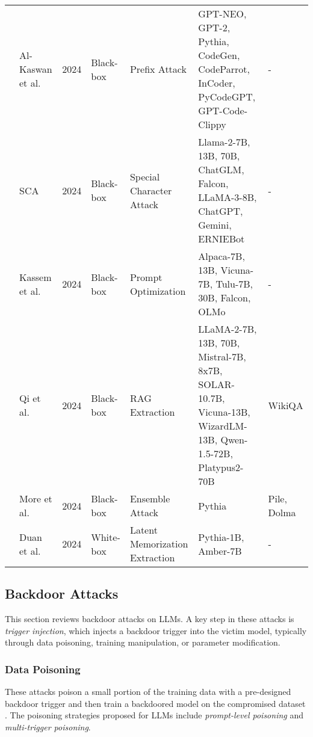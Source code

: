 \begin{table*}[htp]
{\begin{tabular}{p{}p{}p{}p{}p{}p{}p{}}
& Al-Kaswan et al.~\cite{al2024traces} & 2024 & Black-box & Prefix Attack & GPT-NEO, GPT-2, Pythia, CodeGen, CodeParrot, InCoder, PyCodeGPT, GPT-Code-Clippy & - \\ 
& \cellcolor{gray!15!}SCA~\cite{bai2024special} & \cellcolor{gray!15!}2024 & \cellcolor{gray!15!}Black-box & \cellcolor{gray!15!}Special Character Attack & \cellcolor{gray!15!}Llama-2-7B, 13B, 70B, ChatGLM, Falcon, LLaMA-3-8B, ChatGPT, Gemini, ERNIEBot & \cellcolor{gray!15!}- \\ 
& Kassem et al.~\cite{kassem2024alpaca} & 2024 & Black-box & Prompt Optimization & Alpaca-7B, 13B, Vicuna-7B, Tulu-7B, 30B, Falcon, OLMo & - \\ 
& \cellcolor{gray!15!}Qi et al.~\cite{qi2024follow} & \cellcolor{gray!15!}2024 & \cellcolor{gray!15!}Black-box & \cellcolor{gray!15!}RAG Extraction & \cellcolor{gray!15!}LLaMA-2-7B, 13B, 70B, Mistral-7B, 8x7B, SOLAR-10.7B, Vicuna-13B, WizardLM-13B, Qwen-1.5-72B, Platypus2-70B & \cellcolor{gray!15!}WikiQA \\ 
& More et al.~\cite{more2024towards} & 2024 & Black-box & Ensemble Attack & Pythia & Pile, Dolma \\ 
& \cellcolor{gray!15!}Duan et al.~\cite{duan2024uncovering} & \cellcolor{gray!15!}2024 & \cellcolor{gray!15!}White-box & \cellcolor{gray!15!}Latent Memorization Extraction & \cellcolor{gray!15!}Pythia-1B, Amber-7B & \cellcolor{gray!15!}- \\ 
\hline
\end{tabular}
}
\end{table*}


\subsection{Backdoor Attacks}
\label{sec:llm_backdoor_attacks}

This section reviews backdoor attacks on LLMs. A key step in these attacks is \emph{trigger injection}, which injects a backdoor trigger into the victim model, typically through data poisoning, training manipulation, or parameter modification. 

\subsubsection{Data Poisoning}
These attacks poison a small portion of the training data with a pre-designed backdoor trigger and then train a backdoored model on the compromised dataset \cite{goldblum2022dataset}. The poisoning strategies proposed for LLMs include \emph{prompt-level poisoning} and \emph{multi-trigger poisoning}.


